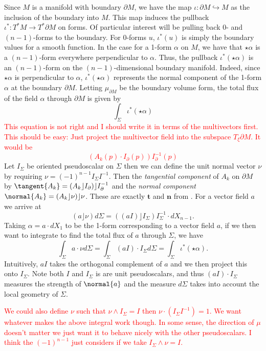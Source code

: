 Since $M$ is a manifold with boundary $\partial M$, we have the map $\iota \colon \partial M \hookrightarrow M$ as the inclusion of the boundary into $M$.  This map induces the pullback $\iota^* \colon T^*M \to T^* \partial M$ on forms. Of particular interest will be pulling back 0- and $(n-1)$-forms to the boundary. For 0-forms $u$, $\iota^*(u)$ is simply the boundary values for a smooth function. In the case for a 1-form $\alpha$ on $M$, we have that $\star \alpha$ is a $(n-1)$-form everywhere perpendicular to $\alpha$.  Thus, the pullback $\iota^*( \star \alpha)$ is an $(n-1)$-form on the $(n-1)$-dimensional boundary manifold.  Indeed, since $\star \alpha$ is perpendicular to $\alpha$, $\iota^*( \star \alpha)$ represents the normal component of the 1-form $\alpha$ at the boundary $\partial M$. Letting $\mu_{\partial M}$ be the boundary volume form, the total flux of the field $\alpha$ through $\partial M$ is given by
\begin{equation}
\label{eq:flux}
\int_\Sigma \iota^* (\star \alpha) 
\end{equation}
\textcolor{red}{This equation is not right and I should write it in terms of the multivectors first. This should be easy: Just project the multivector field into the subspace $T_\xi \partial M$. It would be
\[
(A_k(p) \cdot I_\partial(p))I_\partial^{-1}(p)
\]
}
Let $I_\Sigma$ be oriented pseudoscalar on $\Sigma$ then we can define the unit normal vector $\nu$ by requiring $\nu = (-1)^{n-1} I_\Sigma I^{-1}$.  Then the \emph{tangential component} of $A_k$ on $\partial M$ by $\tangent{A_k} = (A_k \rfloor I_\partial)\rfloor I_\partial^{-1}$ and the \emph{normal component} $\normal{A_k} = (A_k \rfloor \nu)\rfloor \nu$. These are exactly $\mathbf{t}$ and $\mathbf{n}$ from \cite{schwarz_hodge_1995}. For a vector field $a$ we arrive at
\[
(a \rfloor \nu)d\Sigma  = ((aI) \rfloor I_\Sigma) I_{\Sigma}^{-1} \cdot dX_{n-1}.
\]
Taking $\alpha = a\cdot dX_1$ to be the 1-form corresponding to a vector field $a$, if we then want to integrate to find the total flux of $a$ through $\Sigma$, we have
\[
\int_\Sigma a\cdot \nu d\Sigma = \int_\Sigma (aI)\cdot I_\Sigma d\Sigma = \int_\Sigma \iota^*(\star \alpha ).
\]
Intuitively, $aI$ takes the orthogonal complement of $a$ and we then project this onto $I_\Sigma$. Note both $I$ and $I_\Sigma$ is are unit pseudoscalars, and thus $(aI)\cdot  I_\Sigma$ measures the strength of $\normal{a}$ and the measure $d\Sigma$ takes into account the local geometry of $\Sigma$.  


\textcolor{red}{We could also define $\nu$ such that $\nu \wedge I_\Sigma = I$ then $\nu\cdot(I_\Sigma I^{-1})=1$. We want whatever makes the above integral work though. In some sense, the direction of $\mu$ doesn't matter we just want it to behave nicely with the other pseudoscalars. I think the $(-1)^{n-1}$ just considers if we take $I_\Sigma \wedge \nu = I$. }